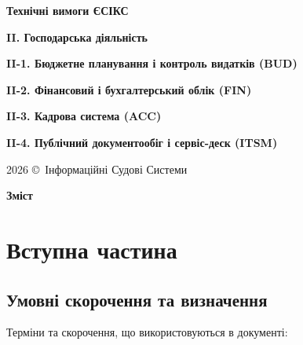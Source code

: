 \documentclass{article}
\newcommand\HUGE[1]{\fontsize{40}{40}\selectfont #1}
\begin{document}
\pagestyle{fancy}

\begin{titlepage}
  \AddToShipoutPictureBG*{\AtPageLowerLeft{\color{nato}\rule{\paperwidth}{\paperheight}}}
  \color{white}\thispagestyle{empty}\vspace*{4cm}\centering
  {\Huge  \textbf{Технічні вимоги ЄСІКС} \par} \vspace{2cm}
  {\HUGE  \textbf{II. Господарська діяльність} \par} \vspace{2.5cm}
  {\LARGE \textbf{II-1. Бюджетне планування і контроль видатків (BUD)} \par}
  {\LARGE \textbf{II-2. Фінансовий і бухгалтерський облік (FIN)} \par}
  {\LARGE \textbf{II-3. Кадрова система (ACC)} \par}
  {\LARGE \textbf{II-4. Публічний документообіг і сервіс-деск (ITSM)} \par} \vspace{2.5cm}
  \vfill
  {\large 2026 \copyright\ Інформаційні Судові Системи \par}
\end{titlepage}

\newpage

\begin{center}
  {\Huge\color{nato}\bfseries Зміст\par}
\end{center}
\vspace{40pt}
\tableofcontents

\begin{abstract}
ТЕХНІЧНІ ВИМОГИ
НА СТВОРЕННЯ ЗАСОБУ ІНФОРМАТИЗАЦІЇ - КОМПОНЕНТІВ ГОСПОДАРСЬКОЇ ДІЯЛЬНОСТІ
ЄДИНОЇ СУДОВОЇ ІНФОРМАЦІЙНО-КОМУНІКАЦІЙНОЇ СИСТЕМИ.
\end{abstract}

\newpage
\section*{Вступна частина}

\subsection*{Умовні скорочення та визначення}

Терміни та скорочення, що використовуються в документі:
\end{document}
